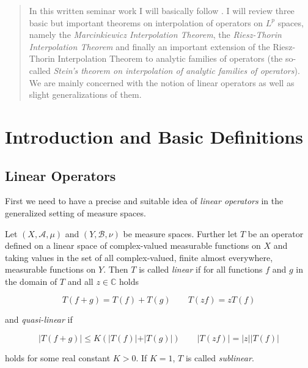 





\maketitle
\thispagestyle{fancy}

\begin{abstract}
	In this written seminar work I will basically follow \cite[33--48]{grafakos:fourier:2014}. I will review three basic but important theorems on interpolation of operators on $L^p$ spaces, namely the \emph{Marcinkiewicz Interpolation Theorem}, the \emph{Riesz-Thorin Interpolation Theorem} and finally an important extension of the Riesz-Thorin Interpolation Theorem to analytic families of operators (the so-called \emph{Stein's theorem on interpolation of analytic families of operators}). We are mainly concerned with the notion of linear operators as well as slight generalizations of them. 
\end{abstract}

\tableofcontents

\mainsectionstyle

\section{Introduction and Basic Definitions}
\subsection{Linear Operators}
First we need to have a precise and suitable idea of \emph{linear operators} in the generalized setting of measure spaces.
\vspace{2mm}
\begin{mdframed}
	\begin{definition}
		Let $(X,\mathcal{A},\mu)$ and $(Y,\mathcal{B},\nu)$ be measure spaces. Further let $T$ be an operator defined on a linear space of complex-valued measurable functions on $X$ and taking values in the set of all complex-valued, finite almost everywhere, measurable functions on $Y$. Then $T$ is called \emph{linear} if for all functions $f$ and $g$ in the domain of $T$ and all $z \in \mathbb{C}$ holds

		\begin{equation}
			T\left( f + g \right) = T(f) + T(g) \qquad T\left( zf \right) = zT(f)
			\label{eq:linear}
		\end{equation}

		and \emph{quasi-linear} if

		\begin{equation}
			\vert T\left( f + g \right) \vert \leqslant K \left( \vert T(f)\vert + \vert T(g)\vert \right) \qquad \vert T(zf) \vert = \vert z\vert \vert T(f)\vert
			\label{eq:quasilinear}
		\end{equation}

		holds for some real constant $K > 0$. If $K = 1$, $T$ is called \emph{sublinear}.
	\end{definition}
\end{mdframed}

